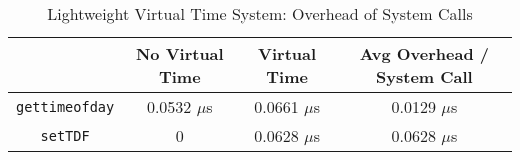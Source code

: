 \begin{table*}
\centering
\caption{Lightweight Virtual Time System: Overhead of System Calls}
\begin{tabular}{c|c|c|c}
\hline
 & No Virtual Time & Virtual Time & Avg Overhead / System Call \\%
\hline
\hline
\texttt{gettimeofday}  & 0.0532 $\mu$s & 0.0661 $\mu$s & 0.0129 $\mu$s\\%
\hline
\texttt{setTDF} & 0  & 0.0628 $\mu$s & 0.0628 $\mu$s\\%
\hline
\end{tabular}
\label{VT:Tab:Overhead}
\end{table*}

